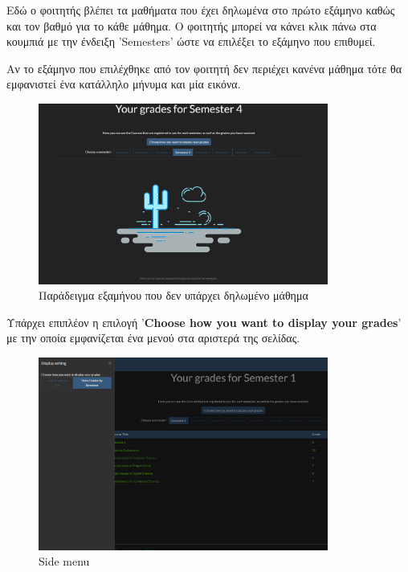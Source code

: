 \documentclass[12pt]{article}
\begin{document}
	Εδώ ο φοιτητής βλέπει τα μαθήματα που έχει δηλωμένα στο πρώτο εξάμηνο καθώς και τον βαθμό για το κάθε μάθημα. Ο φοιτητής μπορεί να κάνει κλικ πάνω στα κουμπιά με την ένδειξη 'Semesters' ώστε να επιλέξει το εξάμηνο που επιθυμεί.
	
	Αν το εξάμηνο που επιλέχθηκε από τον φοιτητή δεν περιέχει κανένα μάθημα τότε θα εμφανιστεί ένα κατάλληλο μήνυμα και μία εικόνα.
	
	\begin{figure}[H]
		\centering
		\includegraphics[width=0.85\textwidth]{nolessons.png}
		\caption{Παράδειγμα εξαμήνου που δεν υπάρχει δηλωμένο μάθημα}
		\label{fig:emptyView}
	\end{figure}
	
	Υπάρχει επιπλέον η επιλογή '\textbf{Choose how you want to display your grades}' με την οποία εμφανίζεται ένα μενού στα αριστερά της σελίδας.

	\begin{figure}[H]
		\centering
		\includegraphics[width=0.85\textwidth]{sidemenu.png}
		\caption{Side menu}
		\label{fig:emptyView}
	\end{figure}	
	
\end{document}

